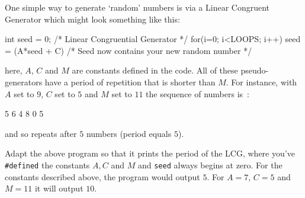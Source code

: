 
One simple way to generate `random' numbers is via a Linear Congruent Generator which
might look something like this:
\begin{codesnippet}
   int seed = 0;
   /* Linear Congruential Generator */
   for(i=0; i<LOOPS; i++){
      seed = (A*seed + C) %
      /* Seed now contains your new random number */
   }
\end{codesnippet}
here, $A$, $C$ and $M$ are constants defined in the code. All of these pseudo-generators have a period of repetition
that is shorter than $M$. For instance, with $A$ set to $9$, $C$ set to $5$ and $M$ set to $11$ the sequence of numbers is~:
\begin{terminaloutput}
5
6
4
8
0
5
\end{terminaloutput}
and so repeats after $5$ numbers (period equals $5$).

\begin{exercise}
Adapt the above program so that it prints the period of the LCG, where you've \verb^#defined^ the constants $A, C$ and $M$ and \verb^seed^ always begins at zero. For the constants described above, the program would output $5$. For $A=7$, $C=5$ and $M=11$ it will output $10$.
\end{exercise}
